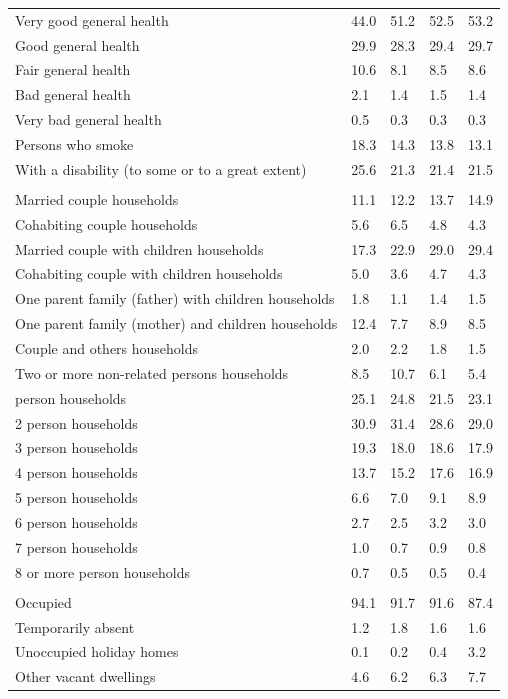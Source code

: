\documentclass{article}
\begin{document}
\begin{table}[h]
\begin{tabular}{KTTTT}
    \hline
Very good general health & 44.0& 51.2&52.5& 53.2\\
Good general health & 29.9& 28.3& 29.4& 29.7\\
Fair general health & 10.6&  8.1& 8.5&  8.6\\
Bad general health & 2.1& 1.4&1.5& 1.4\\
Very bad general health & 0.5& 0.3&0.3& 0.3\\
    \hline
Persons who smoke & 18.3& 14.3&13.8& 13.1\\
    \hline
With a disability (to some or to a great extent) & 25.6& 21.3&21.4& 21.5\\
\hline
    \\ 
    \hline
Married couple households & 11.1& 12.2& 13.7& 14.9\\
Cohabiting couple households & 5.6& 6.5& 4.8& 4.3\\
Married couple with children households & 17.3& 22.9& 29.0& 29.4\\
Cohabiting couple with children households & 5.0& 3.6& 4.7& 4.3\\
One parent family (father) with  children households & 1.8& 1.1& 1.4& 1.5\\
One parent family (mother) and children households & 12.4&  7.7&  8.9&  8.5\\
Couple and others households  & 2.0& 2.2& 1.8& 1.5\\
Two or more non-related persons households &  8.5& 10.7&  6.1&  5.4\\
     person households & 25.1& 24.8& 21.5& 23.1\\
2 person households & 30.9& 31.4& 28.6& 29.0\\
3 person households & 19.3& 18.0& 18.6& 17.9\\
4 person households & 13.7& 15.2& 17.6& 16.9\\
5 person households & 6.6& 7.0& 9.1& 8.9\\
6 person households & 2.7& 2.5& 3.2& 3.0\\
7 person households & 1.0& 0.7& 0.9& 0.8\\
8 or more person households & 0.7& 0.5& 0.5& 0.4\\
\hline
    \\ 
    \hline
Occupied & 94.1& 91.7& 91.6& 87.4\\
Temporarily absent & 1.2& 1.8& 1.6& 1.6\\
Unoccupied holiday homes & 0.1& 0.2& 0.4& 3.2\\
Other vacant dwellings & 4.6& 6.2& 6.3& 7.7\\
\hline
\end{tabular}
\end{table}
\end{document}
